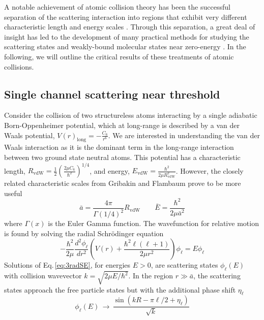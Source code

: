 A notable achievement of atomic collision theory has been the successful separation of the scattering interaction into regions that exhibit very different characteristic length and energy scales \cite{Julienne2009a}.
Through this separation, a great deal of insight has led to the development of many practical methods for studying the scattering states and weakly-bound molecular states near zero-energy \cite{wbz99,Gao01,gao04,Bohn1999,Julienne2009a,Vogels1998,Moerdijk1995,Julienne1989}.
In the following, we will outline the critical results of these treatments of atomic collisions.

\subsection{Single channel scattering near threshold} \label{ssec:low_energy}
Consider the collision of two structureless atoms interacting by a single adiabatic Born-Oppenheimer potential, which at long-range is described by a van der Waals potential, $V(r)_{\text{long}} = -\frac{C_6}{r^6}$.
We are interested in understanding the van der Waals interaction as it is the dominant term in the long-range interaction between two ground state neutral atoms.
This potential has a characteristic length, $R_{\mathrm{vdW}} = \frac{1}{2} \left(\frac{2 \mu C_6}{\hbar^2}\right)^{1/4}$, and energy, $E_\mathrm{vdW}=\frac{\hbar^2}{2\mu R_{\mathrm{vdW}}^2}$.
However, the closely related characteristic scales from Gribakin and Flambaum \cite{Boisseau2000a,gfl93} prove to be more useful 
\begin{equation}
	\bar{a} = \frac{4 \pi}{\Gamma(1/4)^2}R_{\mathrm{vdW}} \quad\quad \bar{E}=\frac{\hbar^2}{2\mu\bar{a}^2}
\end{equation}
where $\Gamma(x)$ is the Euler Gamma function.
The wavefunction for relative motion is found by solving the radial Schr\"{o}dinger equation
\begin{equation} \label{eq:3radSE}
	-\frac{\hbar^2}{2 \mu}\frac{d^2 \phi_{\ell}}{dr^2} \left( V(r) + \frac{\hbar^2\ell(\ell+1)}{2\mu r^2} \right) \phi_{\ell}=E\phi_{\ell}
\end{equation}
Solutions of Eq.\,\ref{eq:3radSE}, for energies $E>0$, are scattering states $\phi_{\ell}(E)$ with collision wavevector $k=\sqrt{2\mu E/\hbar^2}$.
In the region $r\gg\bar{a}$, the scattering states approach the free particle states but with the additional phase shift $\eta_\ell$
\begin{equation} \label{eq:3asymwf}
	\phi_{\ell}(E)\,\rightarrow\,\frac{\sin(kR-\pi\ell/2+\eta_{\ell})}{\sqrt{k}}
\end{equation}

